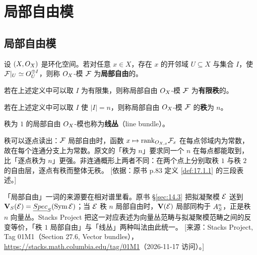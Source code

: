 
\section{局部自由模}\label{sec:17}

\subsection{局部自由模}\label{sec:17.1}

\begin{definition}\label{def:17.1.1}
设 $(X,O_X)$ 是环化空间。若对任意 $x\in X$，存在 $x$ 的开邻域 $U\subseteq X$ 与集合 $I$，使 $\mathcal{F}|_U\simeq O_U^{\oplus I}$，则称 $O_X$-模 $\mathcal{F}$ 为\textbf{局部自由}的。

若在上述定义中可以取 $I$ 为有限集，则称局部自由 $O_X$-模 $\mathcal{F}$ 为\textbf{有限秩}的。

若在上述定义中可以取 $I$ 使 $|I|=n$，则称局部自由 $O_X$-模 $\mathcal{F}$ 的\textbf{秩}为 $n$。

秩为 $1$ 的局部自由 $O_X$-模也称为\textbf{线丛}（line bundle）。
\end{definition}

\begin{yizhu}
秩可以逐点读出：$\mathcal{F}$ 局部自由时，函数 $x\mapsto\mathrm{rank}_{O_{X,x}}\mathcal{F}_x$ 在每点邻域内为常数，故在每个连通分支上为常数。原文的「秩为 $n$」要求同一个 $n$ 在每点都能取到，比「逐点秩为 $n$」更强。非连通概形上两者不同：在两个点上分别取秩 $1$ 与秩 $2$ 的自由层，逐点有秩而整体无秩。
[依据：原书 p.83 定义 \ref{def:17.1.1} 的三段表述。]
\end{yizhu}

\begin{yizhu}
「局部自由」一词的来源要在相对谱里看。原书 §\ref{sec:14.3} 把拟凝聚模 $\mathcal{E}$ 送到 $\mathbf V_S(\mathcal{E})=\underline{Spec}_S(\mathrm{Sym}\,\mathcal{E})$；当 $\mathcal{E}$ 秩 $n$ 局部自由时，$\mathbf V(\mathcal{E})$ 局部同构于 $A^n_S$，正是秩 $n$ 向量丛。Stacks Project 把这一对应表述为向量丛范畴与拟凝聚模范畴之间的反变等价，「秩 $1$ 局部自由」与「线丛」两种叫法由此统一。
[来源：Stacks Project, Tag 01M1（Section 27.6, Vector bundles），\url{https://stacks.math.columbia.edu/tag/01M1}（2026-11-17 访问）。]
\end{yizhu}

